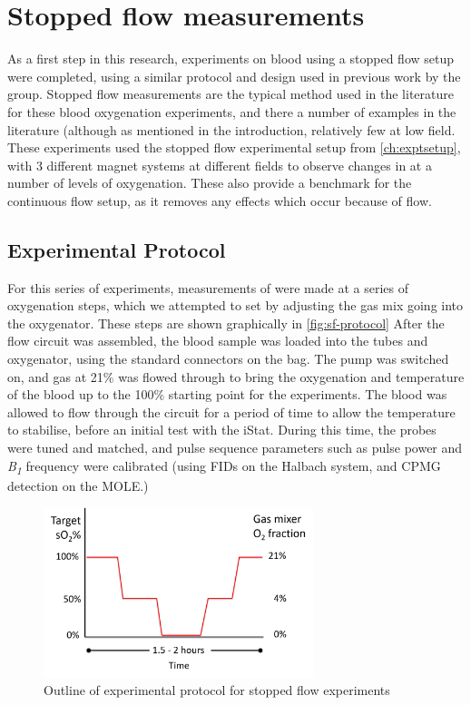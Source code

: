 \chapter{Stopped flow \SOtwo measurements}\label{ch:stoppedflow}

As a first step in this research, experiments on blood using a stopped flow setup were completed, using a similar protocol and design used in previous work by the group.
Stopped flow measurements are the typical method used in the literature for these blood oxygenation \Ttwo experiments, and there a number of examples in the literature\cite{BrooksComparisont2relaxation1995,BryantMagneticrelaxationblood1990,GomoriNMRRelaxationTimes1987} (although as mentioned in the introduction, relatively few at low field.
These experiments used the stopped flow experimental setup from \autoref{ch:exptsetup}, with 3 different magnet systems at different fields to observe changes in \Ttwo at a number of levels of oxygenation.
These also provide a benchmark for the continuous flow setup, as it removes any effects which occur because of flow.

\section{Experimental Protocol}
For this series of experiments, measurements of \Ttwo were made at a series of oxygenation steps, which we attempted to set by adjusting the gas mix going into the oxygenator.
These steps are shown graphically in \autoref{fig:sf-protocol}
After the flow circuit was assembled, the blood sample was loaded into the tubes and oxygenator, using the standard connectors on the bag.
The pump was switched on, and gas at 21\% \Otwo was flowed through to bring the oxygenation and temperature of the blood up to the 100\% starting point for the experiments.
The blood was allowed to flow through the circuit for a period of time to allow the temperature to stabilise, before an initial test with the iStat.
During this time, the probes were tuned and matched, and pulse sequence parameters such as pulse power and \textit{B\textsubscript{1}} frequency were calibrated (using FIDs on the Halbach system, and CPMG detection on the MOLE.)
\begin{figure}[t]
\centering
\includegraphics[width=0.7\textwidth]{figures/stoppedflow/stoppedflowprotocol.png}
\caption{Outline of experimental protocol for stopped flow experiments}
\label{fig:sf-protocol}
\end{figure}

